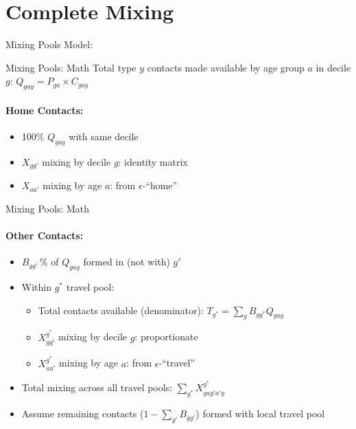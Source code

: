 \section{Complete Mixing}
\begin{frame}{Mixing Pools Model:
  \only<4>{others visiting same decile as me}%
  }
  \centering
  \scalebox{0.8}{\footnotesize}
\end{frame}
\begin{frame}{Mixing Pools: Math}
  Total type $y$ contacts made available by age group $a$ in decile $g$:\quad
  $Q_{gay} = P_{ga} \times C_{gay}$
  \par\bigskip
  \paragraph{Home Contacts:}
  \begin{itemize}
    \item 100\% $Q_{gay}$ with same decile
    \item $X_{gg'}$ mixing by decile $g$: identity matrix
    \item $X_{aa'}$ mixing by age $a$: from $\epsilon$-\polymod ``home''
  \end{itemize}
\end{frame}
\begin{frame}{Mixing Pools: Math}
  \paragraph{Other Contacts:}
  \begin{itemize}
    \item $B_{gg'}$\,\% of $Q_{gay}$ formed in (not with) $g'$
    \item Within $g^*$ travel pool:
    \begin{itemize}
      \item Total contacts available (denominator): $T_{g^*} = \sum_{g} B_{gg^*} Q_{gay}$
      \item $X_{gg'}^{g^*}$ mixing by decile $g$: proportionate
      \item $X_{aa'}^{g^*}$ mixing by age $a$: from $\epsilon$-\polymod ``travel''
    \end{itemize}
    \item Total mixing across all travel pools: $\sum_{g^*} X_{gag'a'y}^{g^*}$
    \item Assume remaining contacts ($1-\sum_{g'} B_{gg'}$) formed with local travel pool
  \end{itemize}
\end{frame}
